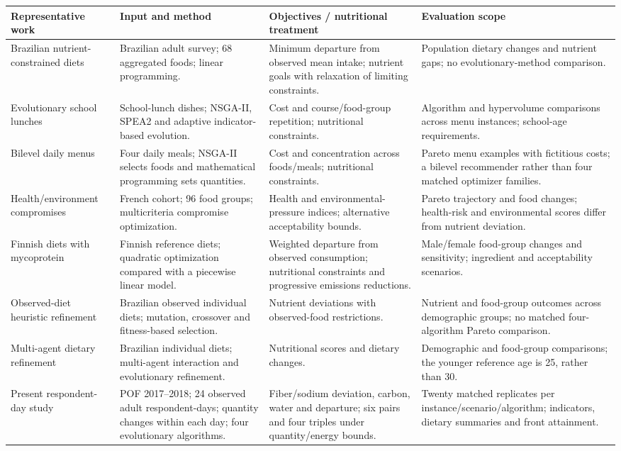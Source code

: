 \begin{tabularx}{\textwidth}{*{4}{>{\raggedright\arraybackslash}X}}
\toprule
Representative work & Input and method & Objectives / nutritional treatment & Evaluation scope \\
\midrule
Brazilian nutrient-constrained diets \cite{dossantos2018food} & Brazilian adult survey; 68 aggregated foods; linear programming. & Minimum departure from observed mean intake; nutrient goals with relaxation of limiting constraints. & Population dietary changes and nutrient gaps; no evolutionary-method comparison. \\
\midrule
Evolutionary school lunches \cite{ramos2021lunches} & School-lunch dishes; NSGA-II, SPEA2 and adaptive indicator-based evolution. & Cost and course/food-group repetition; nutritional constraints. & Algorithm and hypervolume comparisons across menu instances; school-age requirements. \\
\midrule
Bilevel daily menus \cite{pochmann2022multi} & Four daily meals; NSGA-II selects foods and mathematical programming sets quantities. & Cost and concentration across foods/meals; nutritional constraints. & Pareto menu examples with fictitious costs; a bilevel recommender rather than four matched optimizer families. \\
\midrule
Health/environment compromises \cite{kesse2026balancing} & French cohort; 96 food groups; multicriteria compromise optimization. & Health and environmental-pressure indices; alternative acceptability bounds. & Pareto trajectory and food changes; health-risk and environmental scores differ from nutrient deviation. \\
\midrule
Finnish diets with mycoprotein \cite{fu2025finnish} & Finnish reference diets; quadratic optimization compared with a piecewise linear model. & Weighted departure from observed consumption; nutritional constraints and progressive emissions reductions. & Male/female food-group changes and sensitivity; ingredient and acceptability scenarios. \\
\midrule
Observed-diet heuristic refinement \cite{da2025bio} & Brazilian observed individual diets; mutation, crossover and fitness-based selection. & Nutrient deviations with observed-food restrictions. & Nutrient and food-group outcomes across demographic groups; no matched four-algorithm Pareto comparison. \\
\midrule
Multi-agent dietary refinement \cite{da2025intelligent} & Brazilian individual diets; multi-agent interaction and evolutionary refinement. & Nutritional scores and dietary changes. & Demographic and food-group comparisons; the younger reference age is 25, rather than 30. \\
\midrule
Present respondent-day study & POF 2017--2018; 24 observed adult respondent-days; quantity changes within each day; four evolutionary algorithms. & Fiber/sodium deviation, carbon, water and departure; six pairs and four triples under quantity/energy bounds. & Twenty matched replicates per instance/scenario/algorithm; indicators, dietary summaries and front attainment. \\
\bottomrule
\end{tabularx}
